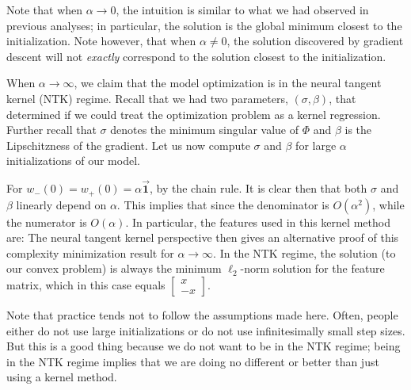 \begin{remark}
Note that when $\alpha \to 0$, the intuition is similar to what we had observed in previous analyses; in particular, the solution is the global minimum closest to the initialization.  Note however, that when $\alpha \neq 0$, the solution discovered by gradient descent will not \textit{exactly} correspond to the solution closest to the initialization.
\end{remark}

\begin{remark}
When $\alpha \to \infty$, we claim that the model optimization is in the neural tangent kernel (NTK) regime.  Recall that we had two parameters, $(\sigma, \beta)$, that determined if we could treat the optimization problem as a kernel regression. Further recall that $\sigma$ denotes the minimum singular value of $\Phi$ and $\beta$ is the Lipschitzness of the gradient. Let us now compute $\sigma$ and $\beta$ for large $\alpha$ initializations of our model.

For $w_-(0) = w_+(0) = \alpha \vec{\mathbf{1}}$,
by the chain rule.  It is clear then that both $\sigma$ and $\beta$ linearly depend on $\alpha$.  This implies that
since the denominator is $O(\alpha^2)$, while the numerator is $O(\alpha)$.  In particular, the features used in this kernel method are:
The neural tangent kernel perspective then gives an alternative proof of this complexity minimization result for $\alpha \to \infty$. In the NTK regime, the solution (to our convex problem) is always the minimum $\ell_2$-norm solution for the feature matrix, which in this case equals $\begin{bmatrix} x \\ - x \end{bmatrix}$. 

Note that practice tends not to follow the assumptions made here. Often, people either do not use large initializations or do not use infinitesimally small step sizes. But this is a good thing  because we do not want to be in the NTK regime; being in the NTK regime implies that we are doing no different or better than just using a kernel method.
\end{remark}


